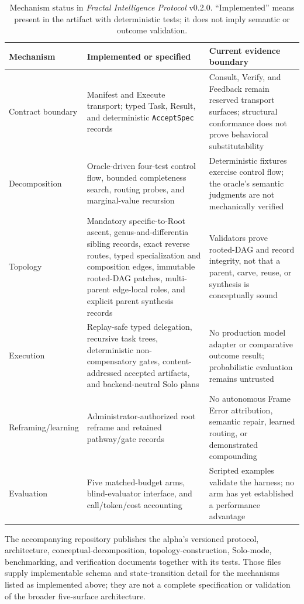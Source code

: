 \documentclass[11pt]{article}
\let\oldtexttt\texttt
\renewcommand{\texttt}[1]{\oldtexttt{\small #1}}
\begin{document}
\begin{table}[H]
\centering
\scriptsize
\caption{Mechanism status in \emph{Fractal Intelligence Protocol} v0.2.0. ``Implemented'' means present in the artifact with deterministic tests; it does not imply semantic or outcome validation.}
\label{tab:mechanism-status}
\begin{tabular}{@{}>{\raggedright\arraybackslash}p{2.7cm}>{\raggedright\arraybackslash}p{5.4cm}>{\raggedright\arraybackslash}p{6.1cm}@{}}
\toprule
\textbf{Mechanism} & \textbf{Implemented or specified} & \textbf{Current evidence boundary} \\
\midrule
Contract boundary & Manifest and Execute transport; typed Task, Result, and deterministic \texttt{AcceptSpec} records & Consult, Verify, and Feedback remain reserved transport surfaces; structural conformance does not prove behavioral substitutability \\
Decomposition & Oracle-driven four-test control flow, bounded completeness search, routing probes, and marginal-value recursion & Deterministic fixtures exercise control flow; the oracle's semantic judgments are not mechanically verified \\
Topology & Mandatory specific-to-Root ascent, genus-and-differentia sibling records, exact reverse routes, typed specialization and composition edges, immutable rooted-DAG patches, multi-parent edge-local roles, and explicit parent synthesis records & Validators prove rooted-DAG and record integrity, not that a parent, carve, reuse, or synthesis is conceptually sound \\
Execution & Replay-safe typed delegation, recursive task trees, deterministic non-compensatory gates, content-addressed accepted artifacts, and backend-neutral Solo plans & No production model adapter or comparative outcome result; probabilistic evaluation remains untrusted \\
Reframing/learning & Administrator-authorized root reframe and retained pathway/gate records & No autonomous Frame Error attribution, semantic repair, learned routing, or demonstrated compounding \\
Evaluation & Five matched-budget arms, blind-evaluator interface, and call/token/cost accounting & Scripted examples validate the harness; no arm has yet established a performance advantage \\
\bottomrule
\end{tabular}
\end{table}

The accompanying repository publishes the alpha's versioned protocol, architecture, conceptual-decomposition, topology-construction, Solo-mode, benchmarking, and verification documents together with its tests. Those files supply implementable schema and state-transition detail for the mechanisms listed as implemented above; they are not a complete specification or validation of the broader five-surface architecture.
\end{document}
